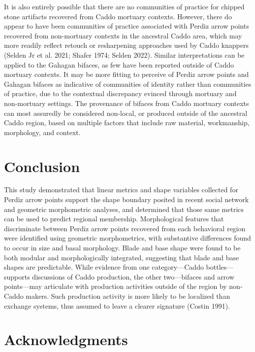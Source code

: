 \documentclass[smallextended]{svjour3}       %
\begin{document}
It is also entirely possible that there are no communities of practice
for chipped stone artifacts recovered from Caddo mortuary contexts.
However, there do appear to have been communities of practice associated
with Perdiz arrow points recovered from non-mortuary contexts in the
ancestral Caddo area, which may more readily reflect retouch or
resharpening approaches used by Caddo knappers (Selden Jr et al. 2021;
Shafer 1974; Selden 2022). Similar interpretations can be applied to the
Gahagan bifaces, as few have been reported outside of Caddo mortuary
contexts. It may be more fitting to perceive of Perdiz arrow points and
Gahagan bifaces as indicative of communities of identity rather than
communities of practice, due to the contextual discrepancy evinced
through mortuary and non-mortuary settings. The provenance of bifaces
from Caddo mortuary contexts can most assuredly be considered non-local,
or produced outside of the ancestral Caddo region, based on multiple
factors that include raw material, workmanship, morphology, and context.

\hypertarget{conclusion}{%
\section{Conclusion}\label{conclusion}}

This study demonstrated that linear metrics and shape variables
collected for Perdiz arrow points support the shape boundary posited in
recent social network and geometric morphometric analyses, and
determined that those same metrics can be used to predict regional
membership. Morphological features that discriminate between Perdiz
arrow points recovered from each behavioral region were identified using
geometric morphometrics, with substantive differences found to occur in
size and basal morphology. Blade and base shape were found to be both
modular and morphologically integrated, suggesting that blade and base
shapes are predictable. While evidence from one category---Caddo
bottles---supports discussions of Caddo production, the other
two---bifaces and arrow points---may articulate with production
activities outside of the region by non-Caddo makers. Such production
activity is more likely to be localized than exchange systems, thus
assumed to leave a clearer signature (Costin 1991).

\hypertarget{acknowledgments}{%
\section{Acknowledgments}\label{acknowledgments}}
\end{document}
